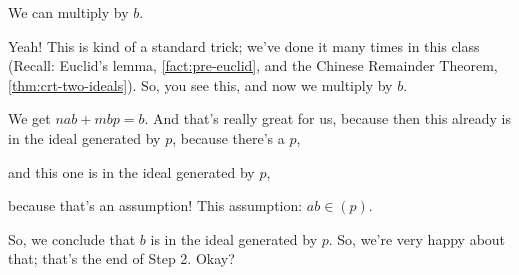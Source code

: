 \begin{proofWrapper}
\begin{student}
We can multiply by $b$.
\end{student}

\begin{speech}[00:55:30 - 00:56:32]
Yeah! This is kind of a standard trick; we've done it many times in this class (Recall: Euclid's lemma, \cref{fact:pre-euclid}, and the Chinese Remainder Theorem, \cref{thm:crt-two-ideals}). So, you see this, and now we multiply by $b$. 

We get $nab + mbp = b$.  And that's really great for us, because then this already is in the ideal generated by $p$, because there's a $p$, 

and this one is in the ideal generated by $p$, 

because that's an assumption! This assumption: $ab \in (p)$. 

So, we conclude that $b$ is in the ideal generated by $p$. So, we're very happy about that; that's the end of Step 2. Okay? 
\end{speech}


\end{proofWrapper}
